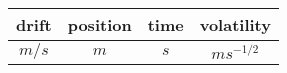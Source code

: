 \begin{tabular}{|c|c|c|c|}
\hline
drift & position & time & volatility\\
\hline
\hline
$m/s$ & $m$ & $s$ & $ms^{-1/2}$\\
\hline
\end{tabular}